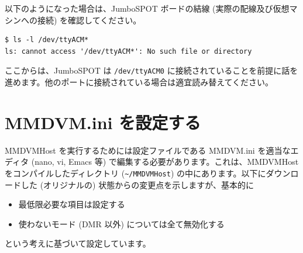 \documentclass[a4j,oneside]{ujbook}
\begin{document}
以下のようになった場合は、JumboSPOT ボードの結線 (実際の配線及び仮想マシンへの接続) を確認してください。

\begin{verbatim}
$ ls -l /dev/ttyACM*
ls: cannot access '/dev/ttyACM*': No such file or directory
\end{verbatim}

ここからは、JumboSPOT は \verb+/dev/ttyACM0+ に接続されていることを前提に話を進めます。他のポートに接続されている場合は適宜読み替えてください。

\section{MMDVM.ini を設定する}

MMDVMHost を実行するためには設定ファイルである MMDVM.ini を適当なエディタ (nano, vi, Emacs 等) で編集する必要があります。これは、MMDVMHost をコンパイルしたディレクトリ (\verb+~/MMDVMHost+) の中にあります。以下にダウンロードした (オリジナルの) 状態からの変更点を示しますが、基本的に
\begin{itemize}
 \item 最低限必要な項目は設定する
 \item 使わないモード (DMR 以外) については全て無効化する
\end{itemize}
という考えに基づいて設定しています。
\end{document}

